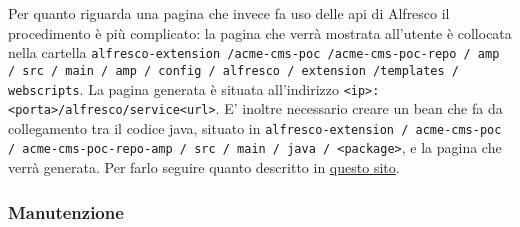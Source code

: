 Per quanto riguarda una pagina che invece fa uso delle api di Alfresco il procedimento è più complicato: la pagina che verrà mostrata all’utente è collocata nella cartella \texttt{alfresco-extension /acme-cms-poc /acme-cms-poc-repo / amp / src / main / amp / config / alfresco / extension /templates / webscripts}.
La pagina generata è situata all’indirizzo \texttt{<ip>:<porta>/alfresco/service<url>}.
E’ inoltre necessario creare un bean che fa da collegamento tra il codice java, situato in \texttt{alfresco-extension / acme-cms-poc / acme-cms-poc-repo-amp / src / main / java / <package>}, e la pagina che verrà generata. Per farlo seguire quanto descritto in \href{http://docs.alfresco.com/community/tasks/bean-config.html}{questo sito}.

\subsubsection{Manutenzione}
